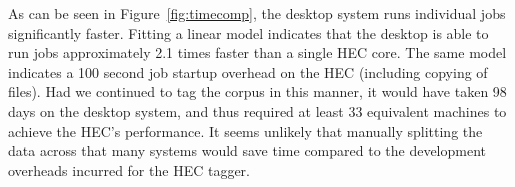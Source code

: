 As can be seen in Figure~\ref{fig:timecomp}, the desktop system runs individual jobs significantly faster.  Fitting a linear model indicates that the desktop is able to run jobs approximately 2.1 times faster than a single HEC core.  The same model indicates a 100 second job startup overhead on the HEC (including copying of files).
Had we continued to tag the corpus in this manner, it would have taken 98 days on the desktop system, and thus required at least 33 equivalent machines to achieve the HEC's performance.  It seems unlikely that manually splitting the data across that many systems would save time compared to the development overheads incurred for the HEC tagger.
